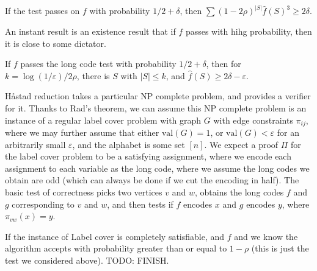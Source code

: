 \begin{theorem}
    If the test passes on $f$ with probability $1/2 + \delta$, then $\sum (1 - 2 \rho)^{|S|} \widehat{f}(S)^3 \geq 2 \delta$.
\end{theorem}

An instant result is an existence result that if $f$ passes with hihg probability, then it is close to some dictator.

\begin{corollary}
    If $f$ passes the long code test with probability $1/2 + \delta$, then for $k = \log(1/\varepsilon)/2\rho$, there is $S$ with $|S| \leq k$, and $\widehat{f}(S) \geq 2 \delta - \varepsilon$.
\end{corollary}

Håstad reduction takes a particular NP complete problem, and provides a verifier for it. Thanks to Rad's theorem, we can assume this NP complete problem is an instance of a regular label cover problem with graph $G$ with edge constraints $\pi_{ij}$, where we may further assume that either $\text{val}(G) = 1$, or $\text{val}(G) < \varepsilon$ for an arbitrarily small $\varepsilon$, and the alphabet is some set $[n]$. We expect a proof $\Pi$ for the label cover problem to be a satisfying assignment, where we encode each assignment to each variable as the long code, where we assume the long codes we obtain are odd (which can always be done if we cut the encoding in half). The basic test of correctness picks two vertices $v$ and $w$, obtains the long codes $f$ and $g$ corresponding to $v$ and $w$, and then tests if $f$ encodes $x$ and $g$ encodes $y$, where $\pi_{vw}(x) = y$.


If the instance of Label cover is completely satisfiable, and $f$ and we know the algorithm accepts with probability greater than or equal to $1 - \rho$ (this is just the test we considered above). TODO: FINISH.



